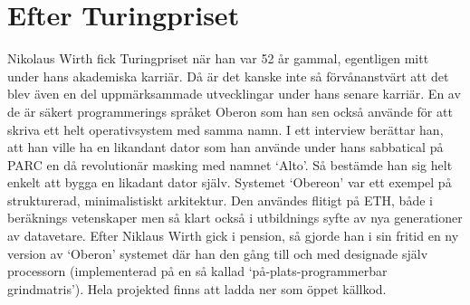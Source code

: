 \section{Efter Turingpriset}
Nikolaus Wirth fick Turingpriset när han var 52 år gammal, egentligen
mitt under hans akademiska karriär. Då är det kanske inte så 
förvånanstvärt att det blev även en del uppmärksammade utvecklingar 
under hans senare karriär. En av de är säkert programmerings språket
Oberon som han sen också använde för att skriva ett helt
operativsystem med samma namn. I ett interview berättar han, att han
ville ha en likandant dator som han använde under hans sabbatical på 
PARC en då revolutionär masking med namnet `Alto'. Så bestämde han sig
helt enkelt att bygga en likadant dator själv. Systemet `Obereon' var
ett exempel på strukturerad, minimalistiskt arkitektur. Den användes
flitigt på ETH, både i beräknings vetenskaper men så klart också i 
utbildnings syfte av nya generationer av datavetare. Efter Niklaus
Wirth gick i pension, så gjorde han i sin fritid en ny version av
`Oberon' systemet där han den gång till och med designade själv
processorn (implementerad på en så kallad `på-plats-programmerbar 
grindmatris'). Hela projekted finns att ladda ner som öppet källkod. 
 

